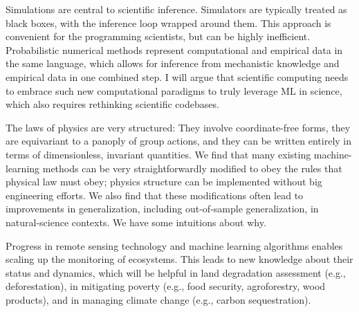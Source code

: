 \license

Simulations are central to scientific inference. Simulators are typically treated as black boxes, with the inference loop wrapped around them. This approach is convenient for the programming scientists, but can be highly inefficient. Probabilistic numerical methods represent computational and empirical data in the same language, which allows for inference from mechanistic knowledge and empirical data in one combined step. I will argue that scientific computing needs to embrace such new computational paradigms to truly leverage ML in science, which also requires rethinking scientific codebases.

\license

The laws of physics are very structured: They involve coordinate-free forms, they are equivariant to a panoply of group actions, and they can be written entirely in terms of dimensionless, invariant quantities. We find that many existing machine-learning methods can be very straightforwardly modified to obey the rules that physical law must obey; physics structure can be implemented without big engineering efforts. We also find that these modifications often lead to improvements in generalization, including out-of-sample generalization, in natural-science contexts. We have some intuitions about why.

\license
{}

Progress in remote sensing technology and machine learning algorithms enables scaling up the monitoring of ecosystems. This leads to new knowledge about their status and dynamics, which will be helpful in land degradation assessment (e.g., deforestation), in mitigating poverty (e.g., food security, agroforestry, wood products), and in managing climate change (e.g., carbon sequestration).

